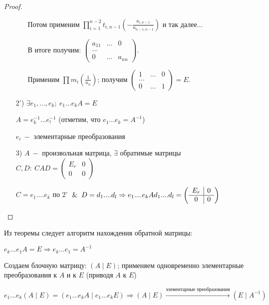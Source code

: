 \begin{proof}
\begin{enumerate}
\begin{enumerate}
        Потом применим 
$\prod\limits_{i=1}^{n-2}t_{i,n-1}(-\frac{a_{i,n-1}}{a_{n-1,n-1}})$ и так 
далее...

        В итоге получим: $\begin{pmatrix}
            a_{11} & ... & 0 \\ ... \\ 0 & ... & a_{nn}
        \end{pmatrix}$.

        Применим $\prod m_i(\frac{1}{a_{ii}})$; получим $\begin{pmatrix}
            1 & ... & 0 \\ ... \\ 0 & ... & 1
        \end{pmatrix}=E$.
        
    \end{enumerate}
    
    \item[2')] $\exists e_1,...,e_k;\ e_1...e_kA=E$

    $A=e^{-1}_k...e_!^{-1}$ (отметим, что $e_1...e_k=A^{-1}$)

    $e_i\ -$ элементарные преобразования
    \item[3)] $A\ -$ произвольная матрица, $\exists$ обратимые матрицы 
$C,D:\ CAD=\left(\begin{array}{c|c}E_r & 0\\\hline 0 & 
0\end{array}\right)$ 

    $C=e_1....e_k$ по 2' $\And D=d_1....d_l\Rightarrow 
e_1....e_kAd_1....d_l=\left(\begin{array}{c|c}E_r & 0\\\hline 0 & 
0\end{array}\right)$
\end{enumerate}

\end{proof}

\begin{corollary}
    Из теоремы следует алгоритм нахождения обратной матрицы:

    $e_k...e_1A=E\Rightarrow e_k...e_1=A^{-1}$

    Создаем блочную матрицу: $(A \mid E)$; применяем одновременно 
элементарные преобразования к $A$ и к $E$ (приводя $A$ к $E$)

    $e_1...e_k(A\mid E)=(e_1...e_kA\mid e_1...e_kE)\Rightarrow (A \mid 
E)\xrightarrow[]{\text{элементарные преобразования}}(E \mid A^{-1})$
\end{corollary}
